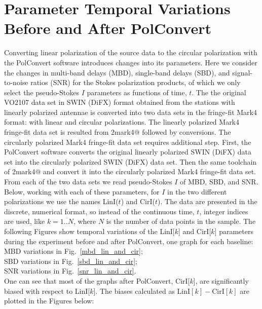 \documentclass[letterpaper,twoside,12pt]{article}
\begin{document}
\section{Parameter Temporal Variations Before and After PolConvert}

Converting linear polarization of the source data to the circular polarization with the PolConvert software introduces changes into its parameters. Here we consider the changes in multi-band delays (MBD), single-band delays (SBD), and signal-to-noise ratios (SNR) for the Stokes polarization products, of which we only select the pseudo-Stokes $I$ parameters as functions of time, $t$. The the original VO2107 data set in SWIN (DiFX) format obtained from the stations with linearly polarized antennae is converted into two data sets in the fringe-fit Mark4 format: with linear and circular polarizations. The linearly polarized Mark4 fringe-fit data set is resulted from \verb@difx2mark4@ followed by \verb@fourfit@ conversions. The circularly polarized Mark4 fringe-fit data set requires additional step. First, the PolConvert software converts the original linearly polarized SWIN (DiFX) data set into the circularly polarized SWIN (DiFX) data set. Then the same toolchain of \verb@difx2mark4@ and \verb@fourfit@ convert it into the circularly polarized Mark4 fringe-fit data set. From each of the two data sets we read pseudo-Stokes $I$ of MBD, SBD, and SNR. Below, working with each of these parameters, for $I$ in the two different polarizations we use the names LinI($t$) and CirI($t$). The data are presented in the discrete, numerical format, so instead of the continuous time, $t$, integer indices are used, like $k=\overline{1..N}$, where $N$ is the number of data points in the sample. The following Figures show temporal variations of the LinI[$k$] and CirI[$k$] parameters during the experiment before and after PolConvert, one graph for each baseline:  \\


\indent MBD variations in Fig.~\ref{mbd_lin_and_cir};  \\
\indent SBD variations in Fig.~\ref{sbd_lin_and_cir};  \\
\indent SNR variations in Fig.~\ref{snr_lin_and_cir}.  \\


One can see that most of the graphs after PolConvert, CirI[$k$], are significantly biased with respect to LinI[$k$]. The biases calculated as $\mathrm{LinI}[k] - \mathrm{CirI}[k]$ are plotted in the Figures below: \\
\end{document}
